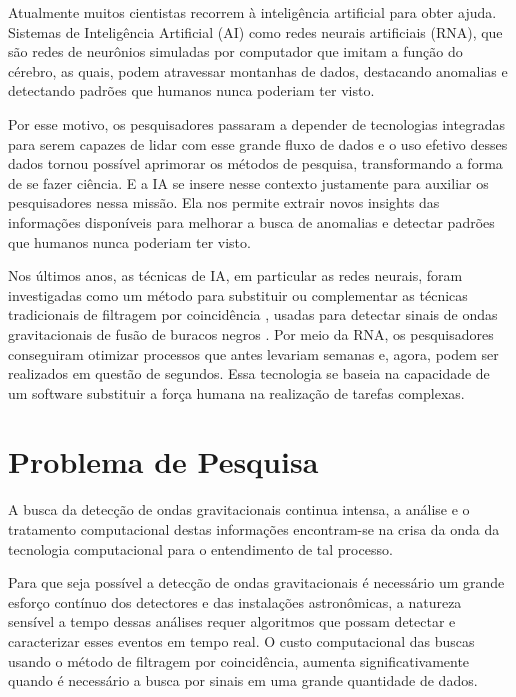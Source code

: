 Atualmente muitos cientistas recorrem à inteligência artificial para obter ajuda. Sistemas de Inteligência Artificial (AI) como redes neurais artificiais (RNA), que são redes de neurônios simuladas por computador que imitam a função do cérebro, as quais, podem atravessar montanhas de dados, destacando anomalias e detectando padrões que humanos nunca poderiam ter visto.

Por esse motivo, os pesquisadores passaram a depender de tecnologias integradas para serem capazes de lidar com esse grande fluxo de dados e o uso efetivo desses dados tornou possível aprimorar os métodos de pesquisa, transformando a forma de se fazer ciência. E a IA se insere nesse contexto justamente para auxiliar os pesquisadores nessa missão. Ela nos permite extrair novos insights das informações disponíveis para melhorar a busca de anomalias e detectar padrões que humanos nunca poderiam ter visto.

Nos últimos anos, as técnicas de IA, em particular as redes neurais, foram investigadas como um método para substituir ou complementar as técnicas tradicionais de filtragem por coincidência \cite{1057571}, usadas para detectar sinais de ondas gravitacionais de fusão de buracos negros \cite{shen2017denoising,PhysRevLett.120.141103,krastev2019real,gebhard2019convolutional,mukund2017transient,kim2015application,george2018deep}. Por meio da RNA, os pesquisadores conseguiram otimizar processos que antes levariam semanas e, agora, podem ser realizados em questão de segundos. Essa tecnologia se baseia na capacidade de um software substituir a força humana na realização de tarefas complexas.


\section{Problema de Pesquisa}

A busca da detecção de ondas gravitacionais continua intensa, a análise e o tratamento computacional destas informações encontram-se na crisa da onda da tecnologia computacional para o entendimento de tal processo.

Para que seja possível a detecção de ondas gravitacionais é necessário um grande esforço contínuo dos detectores e das instalações astronômicas, a natureza sensível a tempo dessas análises requer algoritmos que possam detectar e caracterizar esses eventos em tempo real. O custo computacional das buscas usando o método de filtragem por coincidência, aumenta significativamente quando é necessário a busca por sinais em uma grande quantidade de dados.


